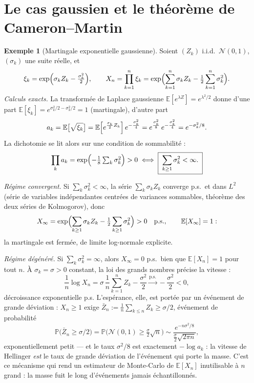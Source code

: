 \documentclass[11pt,a4paper]{article}
\theoremstyle{plain}
\theoremstyle{definition}
\newtheorem{example}[theorem]{Exemple}
\theoremstyle{remark}
\newcommand{\E}{\mathbb{E}}
\newcommand{\Prob}{\mathbb{P}}
\newcommand{\ps}{\text{p.s.}}
\begin{document}
\section{Le cas gaussien et le théorème de Cameron--Martin}

\begin{example}[Martingale exponentielle gaussienne]\label{ex:gauss}
Soient $(Z_k)$ i.i.d.\ $\mathcal{N}(0,1)$, $(\sigma_k)$ une suite réelle, et
\[
\xi_k = \exp\Bigl(\sigma_k Z_k - \tfrac{\sigma_k^2}{2}\Bigr),
\qquad
X_n = \prod_{k=1}^n \xi_k
= \exp\Bigl(\sum_{k=1}^n \sigma_k Z_k - \tfrac12 \sum_{k=1}^n \sigma_k^2\Bigr).
\]
\emph{Calculs exacts.} La transformée de Laplace gaussienne
$\E[e^{\lambda Z}] = e^{\lambda^2/2}$ donne d'une part
$\E[\xi_k] = e^{\sigma_k^2/2 - \sigma_k^2/2} = 1$ (martingale), d'autre part
\[
a_k = \E\bigl[\sqrt{\xi_k}\bigr]
= \E\Bigl[e^{\frac{\sigma_k}{2} Z_k}\Bigr]\, e^{-\frac{\sigma_k^2}{4}}
= e^{\frac{\sigma_k^2}{8}}\, e^{-\frac{\sigma_k^2}{4}}
= e^{-\sigma_k^2/8}.
\]
La dichotomie se lit alors sur une condition de sommabilité :
\[
\prod_k a_k = \exp\Bigl(-\tfrac18\textstyle\sum_k \sigma_k^2\Bigr) > 0
\iff
\boxed{\;\sum_{k\ge1} \sigma_k^2 < \infty.\;}
\]

\emph{Régime convergent.} Si $\sum_k \sigma_k^2 < \infty$, la série
$\sum_k \sigma_k Z_k$ converge p.s.\ et dans $L^2$ (série de variables
indépendantes centrées de variances sommables, théorème des deux séries de
Kolmogorov), donc
\[
X_\infty = \exp\Bigl(\sum_{k\ge1}\sigma_k Z_k
- \tfrac12\sum_{k\ge1}\sigma_k^2\Bigr) > 0 \quad \ps,
\qquad \E[X_\infty] = 1 :
\]
la martingale est fermée, de limite log-normale explicite.

\emph{Régime dégénéré.} Si $\sum_k \sigma_k^2 = \infty$, alors $X_\infty = 0$
p.s.\ bien que $\E[X_n] = 1$ pour tout $n$. À $\sigma_k = \sigma > 0$ constant,
la loi des grands nombres précise la vitesse :
\[
\frac1n \log X_n = \sigma\,\frac{1}{n}\sum_{k=1}^n Z_k - \frac{\sigma^2}{2}
\xrightarrow{\ps} -\frac{\sigma^2}{2} < 0,
\]
décroissance exponentielle p.s. L'espérance, elle, est portée par un événement
de grande déviation : $X_n \ge 1$ exige
$\bar{Z}_n := \frac1n\sum_{k\le n} Z_k \ge \sigma/2$, événement de probabilité
\[
\Prob\bigl(\bar{Z}_n \ge \sigma/2\bigr)
= \Prob\bigl(\mathcal{N}(0,1) \ge \tfrac{\sigma}{2}\sqrt{n}\bigr)
\sim \frac{e^{-n\sigma^2/8}}{\frac{\sigma}{2}\sqrt{2\pi n}},
\]
exponentiellement petit --- et le taux $\sigma^2/8$ est exactement
$-\log a_k$ : la vitesse de Hellinger \emph{est} le taux de grande déviation de
l'événement qui porte la masse. C'est ce mécanisme qui rend un estimateur de
Monte-Carlo de $\E[X_n]$ inutilisable à $n$ grand : la masse fuit le long
d'événements jamais échantillonnés.
\end{example}
\end{document}

